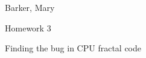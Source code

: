 \documentclass{article}
\def \hwnum{3}
\def \hwdescription{Finding the bug in CPU fractal code}
\def \hwscript{hw03.cu}
\begin{document}
{\color{white}{thing}}
\begin{center}
{
	\fontsize{20pt}{20pt}\selectfont
	Barker, Mary
}

\vspace{1cm}

{
	\fontsize{20pt}{20pt}\selectfont
	Homework \hwnum
}

\vspace{1cm}

{
	\fontsize{20pt}{20pt}\selectfont
	\hwdescription
}

\end{center}
\pagebreak

\end{document}
